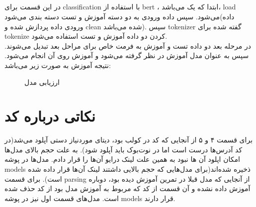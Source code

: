 \documentclass[a4paper]{article}
\begin{document}
\subsection{}
در این قسمت برای classification با استفاده از bert ، ابتدا  که یک  می‌باشد، load می‌شود.
\newline
سپس داده ورودی به دو دسته آموزش و تست دسته بندی می‌شود(داده ورودی داده پردازش شده و clean شده می‌باشد). سپس tokenizer گفته شده برای tokenize کردن دو داده آموزش و تست استفاده می‌شود.
\\
در مرحله بعد دو داده تست و آموزش به فرمت خاص برای مراحل بعد تبدیل می‌شوند. سپس  به عنوان مدل آموزش در نظر گرفته می‌شود و آموزش روی آن انجام می‌شود. نتیجه آموزش به صورت زیر می‌باشد:
\begin{figure}[h!]
\caption{ارزیابی مدل}
\label{f1}
\end{figure}
\vspace{10mm}
\newline
\section{نکاتی درباره کد}
برای قسمت ۴ و ۵ از آنجایی که کد در کولب بود، دیتای موردنیاز دستی آپلود می‌شد(در کد  آدرس‌ها درست است اما در نوت‌بوک باید آپلود شود).
به علت حجم بالای مدل‌ها امکان اپلود آن ها نبود به همین علت لینک درایو آن‌ها را قرار دادم.
\newline
مدل‌ها در پوشه models ذخیره‌ شده‌اند(برای مدل‌هایی که حجم بالایی داشتند لینک آن‌ها قرار داده شده است).
برای قسمت parsing از آنجایی که مدل قبلا در تمرین آموزش دیده بود، دوباره آموزش داده نشده و آن قسمت از کد که مربوط به آموزش مدل بود از کد حذف شده است.
\newline
مدل‌های قسمت اول نیز در پوشه models قرار دارند.
\newpage
\end{document}
